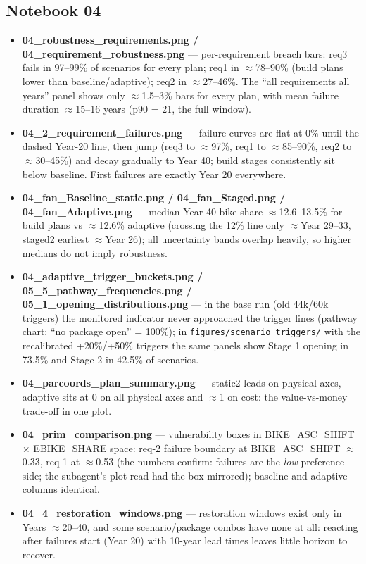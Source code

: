 \documentclass[10pt,a4paper]{article}
\begin{document}
\subsection{Notebook 04}
\begin{itemize}
\item \textbf{04\_robustness\_requirements.png / 04\_requirement\_robustness.png} --- per-requirement breach bars: req3 fails in 97--99\% of scenarios for every plan; req1 in $\approx$78--90\% (build plans lower than baseline/adaptive); req2 in $\approx$27--46\%. The ``all requirements all years'' panel shows only $\approx$1.5--3\% bars for every plan, with mean failure duration $\approx$15--16 years (p90 = 21, the full window).
\item \textbf{04\_2\_requirement\_failures.png} --- failure curves are flat at 0\% until the dashed Year-20 line, then jump (req3 to $\approx$97\%, req1 to $\approx$85--90\%, req2 to $\approx$30--45\%) and decay gradually to Year 40; build stages consistently sit below baseline. First failures are exactly Year 20 everywhere.
\item \textbf{04\_fan\_Baseline\_static.png / 04\_fan\_Staged.png / 04\_fan\_Adaptive.png} --- median Year-40 bike share $\approx$12.6--13.5\% for build plans vs $\approx$12.6\% adaptive (crossing the 12\% line only $\approx$Year 29--33, staged2 earliest $\approx$Year 26); all uncertainty bands overlap heavily, so higher medians do not imply robustness.
\item \textbf{04\_adaptive\_trigger\_buckets.png / 05\_5\_pathway\_frequencies.png / 05\_1\_opening\_distributions.png} --- in the base run (old 44k/60k triggers) the monitored indicator never approached the trigger lines (pathway chart: ``no package open'' = 100\%); in \texttt{figures/scenario\_triggers/} with the recalibrated +20\%/+50\% triggers the same panels show Stage 1 opening in 73.5\% and Stage 2 in 42.5\% of scenarios.
\item \textbf{04\_parcoords\_plan\_summary.png} --- static2 leads on physical axes, adaptive sits at 0 on all physical axes and $\approx$1 on cost: the value-vs-money trade-off in one plot.
\item \textbf{04\_prim\_comparison.png} --- vulnerability boxes in BIKE\_ASC\_SHIFT $\times$ EBIKE\_SHARE space: req-2 failure boundary at BIKE\_ASC\_SHIFT $\approx$0.33, req-1 at $\approx$0.53 (the numbers confirm: failures are the \emph{low}-preference side; the subagent's plot read had the box mirrored); baseline and adaptive columns identical.
\item \textbf{04\_4\_restoration\_windows.png} --- restoration windows exist only in Years $\approx$20--40, and some scenario/package combos have none at all: reacting after failures start (Year 20) with 10-year lead times leaves little horizon to recover.

\end{itemize}
\end{document}
